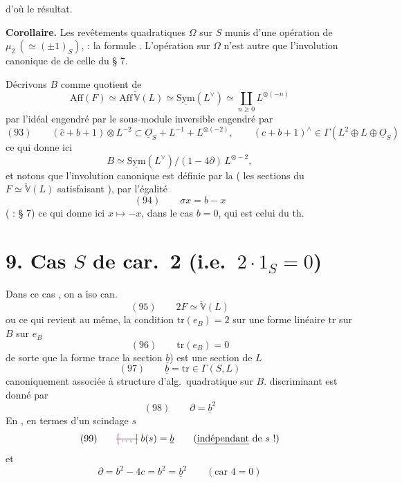 \documentclass[11pt,a4paper]{article}
\begin{document}
d'où le résultat.

\textbf{Corollaire.}  Les revêtements quadratiques $\Omega$ sur $S$
\ill{}  \ill{} munis d'une opération de $\mu_2\ (\simeq (\pm 1)_S)$,
\ill{} : la formule . L'opération \struck{\ill{}}
 sur $\Omega$ n'est autre que l'involution canonique de
\ill{}  de celle du § 7.

Décrivons   $B$
comme quotient de
\[
\underline{\mathrm{Aff}}(F) \simeq \underline{\mathrm{Aff}}\, \check{\mathbb{V}}(L)
\simeq \underline{\mathrm{Sym}}(L^{\vee}) \simeq \coprod_{n \geqslant 0} L^{\otimes(-n)}
\]
par l'idéal engendré par le sous-module inversible engendré par
\[
(93)\qquad (\hat{c} + b + 1) \otimes L^{-2} \subset \underline{O}_S + L^{-1} + L^{\otimes(-2)},
\qquad (c + b + 1)^{\wedge} \in \Gamma(L^2 \oplus L \oplus \underline{O}_S)
\]
 ce qui donne ici
\[
B \simeq \underline{\mathrm{Sym}}(L^{\vee}) / (1 - 4\partial)\, L^{\otimes -2} ,
\]
et notons que l'involution canonique est définie par la
 (\struck{\ill{}}  les sections du
$F \simeq \check{\mathbb{V}}(L)$ satisfaisant \uncertain{$\alpha$}), par l'égalité
\[
(94)\qquad \sigma x = b - x
\]
( : § 7) ce qui donne ici $x \longmapsto -x$, dans le cas
$b = 0$, qui est celui du th.

\section{9. \quad Cas $S$ de car.\ 2 (i.e.\ $2 \cdot 1_S = 0$)}

Dans ce cas , on a iso can.
\[
(95)\qquad 2F \simeq \check{\mathbb{V}}(L)
\]
ou ce qui revient au même, la condition $\mathrm{tr}(e_B) = 2$ sur une forme
linéaire $\mathrm{tr}$ sur $B$ \struck{\ill{}}  sur $e_B$
 
\[
(96)\qquad \mathrm{tr}(e_B) = 0
\]
de sorte que la forme trace  \ill{} 
la section $\underline{b}$) est une section de $L$
\[
(97)\qquad \underline{b} = \mathrm{tr} \in \Gamma(S, L)
\]
canoniquement associée à  structure d'alg.\ quadratique sur $B$.
  discriminant est donné par
\[
(98)\qquad \partial = \underline{b}^2
\]
En , en termes d'un scindage $s$  
\struck{\ill{}}
\[
(99)\qquad \text{\struck{\ill{}}}\; b(s) = \underline{b}
\qquad \text{(\uncertain{indépendant} de $s$ !)}
\]
et
\[
\partial = b^2 - 4c = b^2 = \underline{b}^2 \qquad (\text{car } 4 = 0)
\]
\end{document}

